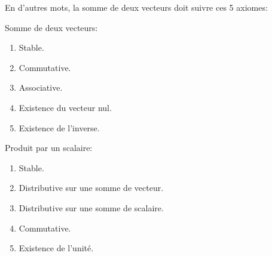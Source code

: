 \documentclass[a4paper]{article}
\begin{document}
{    En d'autres mots, la somme de deux vecteurs doit suivre ces 5 axiomes:

    \begin{center}
    \begin{minipage}[t]{0.45\textwidth}\vspace{0pt}
    Somme de deux vecteurs:
    \begin{enumerate}
        \item Stable.
        \item Commutative.
        \item Associative.
        \item Existence du vecteur nul.
        \item Existence de l'inverse.
    \end{enumerate}
    
    \end{minipage}
    \hfill
    \begin{minipage}[t]{0.45\textwidth}\vspace{0pt}
    Produit par un scalaire:
    \begin{enumerate}
        \item Stable.
        \item Distributive sur une somme de vecteur.
        \item Distributive sur une somme de scalaire.
        \item Commutative.
        \item Existence de l'unité.
    \end{enumerate}
    
    \end{minipage}
    \end{center}
}


\end{document}
